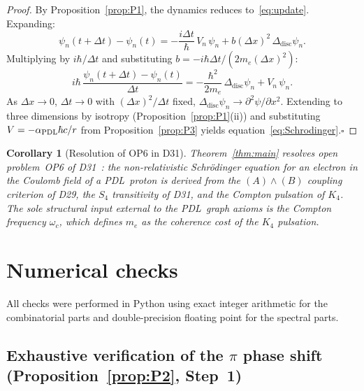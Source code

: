 \documentclass[11pt,a4paper]{article}
\newtheorem{corollary}[theorem]{Corollary}
\theoremstyle{definition}
\newcommand{\PDL}{\textnormal{PDL}}
\newcommand{\hb}{\hbar}
\newcommand{\aPDL}{\alpha_{\PDL}}
\begin{document}
\begin{proof}
By Proposition~\ref{prop:P1}, the dynamics reduces to~\eqref{eq:update}. Expanding:
\begin{equation}
\psi_n(t+\Delta t) - \psi_n(t) = -\frac{i\Delta t}{\hb}\,V_n\,\psi_n + b(\Delta x)^2\,\Delta_{\mathrm{disc}}\psi_n.
\end{equation}
Multiplying by $i\hb/\Delta t$ and substituting $b = -i\hb\Delta t/(2m_e(\Delta x)^2)$:
\begin{equation}
i\hb\,\frac{\psi_n(t+\Delta t)-\psi_n(t)}{\Delta t} = -\frac{\hb^2}{2m_e}\,\Delta_{\mathrm{disc}}\psi_n + V_n\,\psi_n.
\label{eq:discSchrod}
\end{equation}
As $\Delta x\to 0$, $\Delta t\to 0$ with $(\Delta x)^2/\Delta t$ fixed, $\Delta_{\mathrm{disc}}\psi_n \to \partial^2\psi/\partial x^2$. Extending to three dimensions by isotropy (Proposition~\ref{prop:P1}(ii)) and substituting $V = -\aPDL\hb c/r$ from Proposition~\ref{prop:P3} yields equation~\eqref{eq:Schrodinger}.\hfill$\square$
\end{proof}

\begin{corollary}[Resolution of OP6 in D31]
\label{cor:OP6}
Theorem~\ref{thm:main} resolves open problem~OP6 of D31~\cite{PDL_D31_2026}: the non-relativistic Schr\"odinger equation for an electron in the Coulomb field of a \PDL\ proton is derived from the $(A)\wedge(B)$ coupling criterion of D29, the $S_4$ transitivity of D31, and the Compton pulsation of $K_4$. The sole structural input external to the \PDL\ graph axioms is the Compton frequency $\omega_c$, which defines $m_e$ as the coherence cost of the $K_4$ pulsation.
\end{corollary}

\section{Numerical checks}
\label{sec:numerics}

All checks were performed in Python using exact integer arithmetic for the combinatorial parts and double-precision floating point for the spectral parts.

\subsection{Exhaustive verification of the \texorpdfstring{$\pi$}{π} phase shift (Proposition~\ref{prop:P2}, Step~1)}
\end{document}
